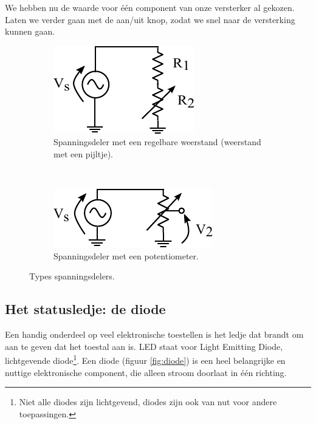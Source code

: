 \documentclass{article}
\begin{document}
			We hebben nu de waarde voor \'e\'en component van onze versterker al gekozen. Laten we verder gaan met de aan/uit knop, zodat we snel naar de versterking kunnen gaan.
			\begin{figure}
				\centering
				\begin{subfigure}[b]{0.45\linewidth}
					\centering
					\includegraphics{regelbareR}
					\caption{Spanningsdeler met een regelbare weerstand (weerstand met een pijltje).}
					\label{subfig:regelbareR}
				\end{subfigure}
				~
				\begin{subfigure}[b]{0.45\linewidth}
					\centering
					\includegraphics{potentiometer.pdf}
					\caption{Spanningsdeler met een potentiometer.}
					\label{subfig:pot}
				\end{subfigure}
			\caption{Types spanningsdelers.}
			\label{fig:vdeler} 
			\end{figure}

		\subsection{Het statusledje: de diode}
			Een handig onderdeel op veel elektronische toestellen is het ledje dat brandt om aan te geven dat het toestal aan is. LED staat voor Light Emitting Diode, lichtgevende diode\footnote{Niet alle diodes zijn lichtgevend, diodes zijn ook van nut voor andere toepassingen.}. Een diode (figuur \ref{fig:diode}) is een heel belangrijke en nuttige elektronische component, die alleen stroom doorlaat in \'e\'en richting.
\end{document}
